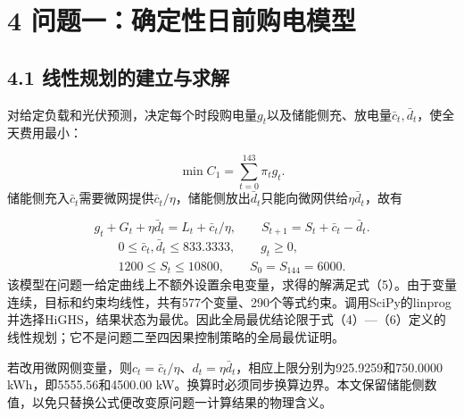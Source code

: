 \documentclass[UTF8,a4paper,zihao=-4,fontset=windows]{ctexart}
\begin{document}
\section{4 问题一：确定性日前购电模型}
\subsection{4.1 线性规划的建立与求解}
对给定负载和光伏预测，决定每个时段购电量$g_t$以及储能侧充、放电量$\bar c_t,\bar d_t$，使全天费用最小：
\par
\begin{equation}
\min C_1=\sum_{t=0}^{143}\pi_tg_t. \tag{4}
\end{equation}
储能侧充入$\bar c_t$需要微网提供$\bar c_t/\eta$，储能侧放出$\bar d_t$只能向微网供给$\eta\bar d_t$，故有
\par
\begin{equation}
g_t+G_t+\eta\bar d_t=L_t+\bar c_t/\eta,\qquad S_{t+1}=S_t+\bar c_t-\bar d_t. \tag{5}
\end{equation}
\begin{equation}
\begin{gathered}
0\le\bar c_t,\bar d_t\le833.3333,\qquad g_t\ge0,\\
1200\le S_t\le10800,\qquad S_0=S_{144}=6000.
\end{gathered} \tag{6}
\end{equation}
该模型在问题一给定曲线上不额外设置余电变量，求得的解满足式（5）。由于变量连续，目标和约束均线性，共有577个变量、290个等式约束。调用SciPy的linprog并选择HiGHS，结果状态为最优。因此全局最优结论限于式（4）—（6）定义的线性规划；它不是问题二至四因果控制策略的全局最优证明。
\par
若改用微网侧变量，则$c_t=\bar c_t/\eta$、$d_t=\eta\bar d_t$，相应上限分别为925.9259和750.0000 kWh，即5555.56和4500.00 kW。换算时必须同步换算边界。本文保留储能侧数值，以免只替换公式便改变原问题一计算结果的物理含义。
\par
\end{document}
